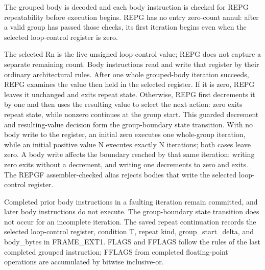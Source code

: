 The grouped body is decoded and each body instruction is checked for REPG repeatability before execution begins.
REPG has no entry zero-count annul: after a valid group has passed those checks, its first iteration begins even
when the selected loop-control register is zero.

The selected Rn is the live unsigned loop-control value; REPG does not capture a separate remaining count. Body
instructions read and write that register by their ordinary architectural rules. After one whole grouped-body
iteration succeeds, REPG examines the value then held in the selected register. If it is zero, REPG leaves it
unchanged and exits repeat state. Otherwise, REPG first decrements it by one and then uses the resulting value to
select the next action: zero exits repeat state, while nonzero continues at the group start. This guarded decrement
and resulting-value decision form the group-boundary state transition. With no body write to the register, an
initial zero executes one whole-group iteration, while an initial positive value N executes exactly N iterations;
both cases leave zero. A body write affects the boundary reached by that same iteration: writing zero exits without
a decrement, and writing one decrements to zero and exits. The REPGF assembler-checked alias rejects bodies that
write the selected loop-control register.

Completed prior body instructions in a faulting iteration remain committed, and later body instructions do not
execute. The group-boundary state transition does not occur for an incomplete iteration. The saved repeat
continuation records the selected loop-control register, condition T, repeat kind,
group\_start\_delta, and body\_bytes in FRAME\_EXT1. FLAGS and FFLAGS follow the rules of the last completed grouped
instruction; FFLAGS from completed floating-point operations are accumulated by bitwise inclusive-or.
